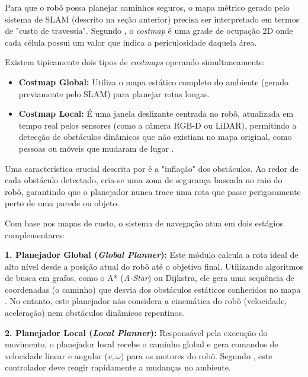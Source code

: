 Para que o robô possa planejar caminhos seguros, o mapa métrico gerado pelo sistema de SLAM (descrito na seção anterior) precisa ser interpretado em termos de "custo de travessia". Segundo , o \textit{costmap} é uma grade de ocupação 2D onde cada célula possui um valor que indica a periculosidade daquela área.

Existem tipicamente dois tipos de \textit{costmaps} operando simultaneamente:
\begin{itemize}
    \item \textbf{Costmap Global:} Utiliza o mapa estático completo do ambiente (gerado previamente pelo SLAM) para planejar rotas longas.
    \item \textbf{Costmap Local:} É uma janela deslizante centrada no robô, atualizada em tempo real pelos sensores (como a câmera RGB-D ou LiDAR), permitindo a detecção de obstáculos dinâmicos que não existiam no mapa original, como pessoas ou móveis que mudaram de lugar \cite{macenski2020marathon2navigation}.
\end{itemize}

Uma característica crucial descrita por  é a "inflação" dos obstáculos. Ao redor de cada obstáculo detectado, cria-se uma zona de segurança baseada no raio do robô, garantindo que o planejador nunca trace uma rota que passe perigosamente perto de uma parede ou objeto.

Com base nos mapas de custo, o sistema de navegação atua em dois estágios complementares:

\textbf{1. Planejador Global (\textit{Global Planner}):} Este módulo calcula a rota ideal de alto nível desde a posição atual do robô até o objetivo final. Utilizando algoritmos de busca em grafos, como o A* (\textit{A-Star}) ou Dijkstra, ele gera uma sequência de coordenadas (o caminho) que desvia dos obstáculos estáticos conhecidos no mapa \cite{marder-eppstein2010officemarathonrobust}. No entanto, este planejador não considera a cinemática do robô (velocidade, aceleração) nem obstáculos dinâmicos repentinos.

\textbf{2. Planejador Local (\textit{Local Planner}):} Responsável pela execução do movimento, o planejador local recebe o caminho global e gera comandos de velocidade linear e angular ($v, \omega$) para os motores do robô. Segundo , este controlador deve reagir rapidamente a mudanças no ambiente.


